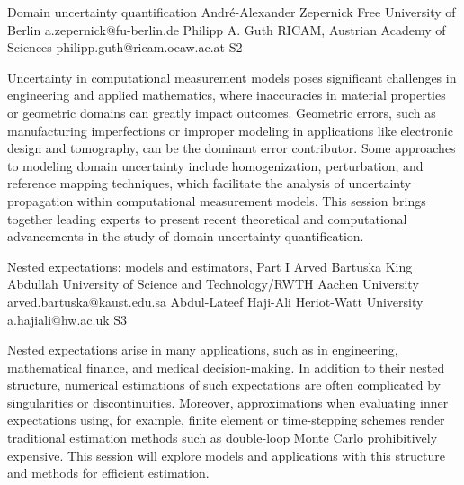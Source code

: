 \begin{session}
 {Domain uncertainty quantification}%
 {Andr\'e-Alexander Zepernick}%
 {Free University of Berlin}%
 {a.zepernick@fu-berlin.de}%
 {Philipp A. Guth}%
 {RICAM, Austrian Academy of Sciences}%
 {philipp.guth@ricam.oeaw.ac.at}%
 {S2}%
 {}%

 Uncertainty in computational measurement models poses significant challenges in engineering and applied mathematics, where inaccuracies in material properties or geometric domains can greatly impact outcomes. Geometric errors, such as manufacturing imperfections or improper modeling in applications like electronic design and tomography, can be the dominant error contributor. Some approaches to modeling domain uncertainty include homogenization, perturbation, and reference mapping techniques, which facilitate the analysis of uncertainty propagation within computational measurement models. This session brings together leading experts to present recent theoretical and computational advancements in the study of domain uncertainty quantification.
\end{session}



\clearpage

\begin{session}
 {Nested expectations: models and estimators, Part I}%
 {Arved Bartuska}%
 {King Abdullah University of Science and Technology/RWTH Aachen University}%
 {arved.bartuska@kaust.edu.sa}%
 {Abdul-Lateef Haji-Ali}%
 {Heriot-Watt University}%
 {a.hajiali@hw.ac.uk}%
 {S3}%
{}

 Nested expectations arise in many applications, such as in engineering, mathematical finance, and medical decision-making. In addition to their nested structure, numerical estimations of such expectations are often complicated by singularities or discontinuities. Moreover, approximations when evaluating inner expectations using, for example, finite element or time-stepping schemes render traditional estimation methods such as double-loop Monte Carlo prohibitively expensive. This session will explore models and applications with this structure and methods for efficient estimation.
\end{session}

